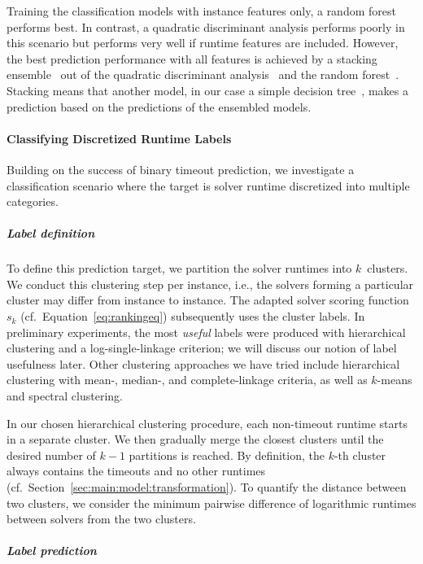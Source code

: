 \documentclass[sn-basic, Numbered]{sn-jnl} %
\begin{document}
Training the classification models with instance features only, a random forest performs best.
In contrast, a quadratic discriminant analysis performs poorly in this scenario but performs very well if runtime features are included.
However, the best prediction performance with all features is achieved by a stacking ensemble~\cite{wolpert1992stacked} out of the quadratic discriminant analysis~\cite{tharwat2016linear} and the random forest~\cite{breiman2001random}.
Stacking means that another model, in our case a simple decision tree~\cite{breiman1984classification}, makes a prediction based on the predictions of the ensembled models.

\paragraph{Classifying Discretized Runtime Labels}

Building on the success of binary timeout prediction, we investigate a classification scenario where the target is solver runtime discretized into multiple categories.

\subparagraph{Label definition}

To define this prediction target, we partition the solver runtimes into $k$~clusters.
We conduct this clustering step per instance, i.e., the solvers forming a particular cluster may differ from instance to instance.
The adapted solver scoring function~$s_k$ (cf.~Equation~\eqref{eq:rankingeq}) subsequently uses the cluster labels.
In preliminary experiments, the most \emph{useful} labels were produced with hierarchical clustering and a log-single-linkage criterion; we will discuss our notion of label usefulness later.
Other clustering approaches we have tried include hierarchical clustering with mean-, median-, and complete-linkage criteria, as well as $k$-means and spectral clustering.

In our chosen hierarchical clustering procedure, each non-timeout runtime starts in a separate cluster.
We then gradually merge the closest clusters until the desired number of $k-1$ partitions is reached.
By definition, the $k$-th cluster always contains the timeouts and no other runtimes (cf.~Section~\ref{sec:main:model:transformation}).
To quantify the distance between two clusters, we consider the minimum pairwise difference of logarithmic runtimes between solvers from the two clusters.

\subparagraph{Label prediction}
\end{document}

